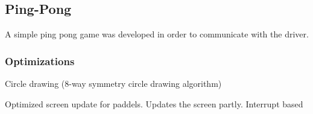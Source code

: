 \subsection{Ping-Pong}
A simple ping pong game was developed in order to communicate with the driver. 



\subsubsection{Optimizations}

Circle drawing (8-way symmetry circle drawing algorithm)

Optimized screen update for paddels. Updates the screen partly. Interrupt based 
